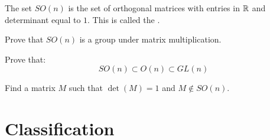 \documentclass{ximera}
\begin{document}
\begin{definition}
  The set $SO(n)$ is the set of orthogonal matrices with entries in
  $\mathbb R$ and determinant equal to $1$. This is called the .
\end{definition}

\begin{exercise}
  Prove that $SO(n)$ is a group under matrix multiplication.
\end{exercise}


\begin{exercise}
  Prove that:
  \[
  SO(n) \subset O(n) \subset GL(n)
  \]
\end{exercise}


\begin{exercise}
  Find a matrix $M$ such that $\det(M) =1$ and $M\notin SO(n)$. 
\end{exercise}



\section{Classification}
\end{document}
